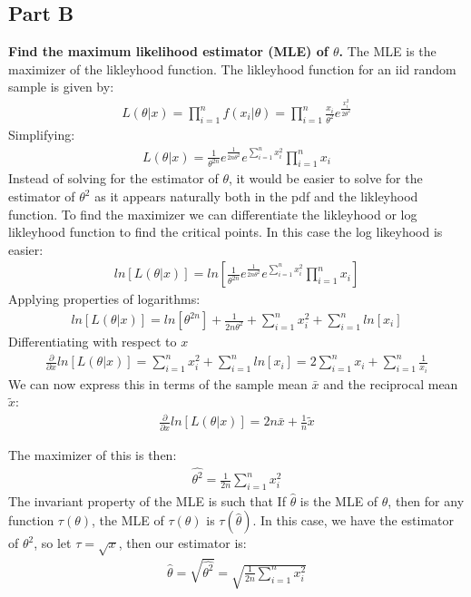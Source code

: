 \documentclass{article}
\begin{document}
\subsection*{Part B}
\textbf{Find the maximum likelihood estimator (MLE) of $\theta$.}
The MLE is the maximizer of the likleyhood function. The likleyhood function for an iid random sample is given by:
\begin{align*}
L(\theta|x) = \prod_{i=1}^{n} f(x_i|\theta) = \prod_{i=1}^{n} \frac{x_i}{\theta^2} e^{\frac{x_i^2}{2\theta^2}}
\end{align*}
Simplifying:
\begin{align*}
L(\theta|x) = \frac{1}{\theta^{2n}} e^{\frac{1}{2n\theta^2}} e^{\sum_{i=1}^{n} {x_i^2}} \prod_{i=1}^{n} x_i
\end{align*}
Instead of solving for the estimator of $\theta$, it would be easier to solve for the estimator of $\theta^2$ as it appears naturally both in the pdf and the likleyhood function. To find the maximizer we can differentiate the likleyhood or log likleyhood function to find the critical points. In this case the log likeyhood is easier:
\begin{align*}
ln[L(\theta|x)] = ln[ \frac{1}{\theta^{2n}} e^{\frac{1}{2n\theta^2}} e^{\sum_{i=1}^{n} {x_i^2}} \prod_{i=1}^{n} x_i ]
\end{align*}
Applying properties of logarithms:
\begin{align*}
ln[L(\theta|x)] = ln[\theta^{2n}] + \frac{1}{2n\theta^2} + \sum_{i=1}^{n} {x_i^2} + \sum_{i=1}^{n} ln[x_i]
\end{align*}
Differentiating with respect to $x$
\begin{align*}
\frac{\partial}{\partial x} ln[L(\theta|x)] = \sum_{i=1}^{n} {x_i^2} + \sum_{i=1}^{n} ln[x_i] = 2\sum_{i=1}^{n} {x_i} + \sum_{i=1}^{n} \frac{1}{x_i}
\end{align*}
We can now express this in terms of the sample mean $\bar{x}$ and the reciprocal mean $\tilde{x}$:
\begin{align*}
\frac{\partial}{\partial x} ln[L(\theta|x)] = 2n \bar{x} + \frac{1}{n} \tilde{x}
\end{align*}


The maximizer of this is then:
\begin{align*}
\hat{\theta^2} = \frac{1}{2n} \sum_{i=1}^{n} x_i^2
\end{align*}
The invariant property of the MLE is such that If $\hat{\theta}$ is the MLE of $\theta$, then for any function $\tau(\theta)$,
the MLE of $\tau(\theta)$ is $\tau(\hat{\theta})$. In this case, we have the estimator of $\theta^2$, so let $\tau=\sqrt{x}$, then our estimator is:
\begin{align*}
\boxed{ \hat{\theta} = \sqrt{\hat{\theta^2}} = \sqrt{ \frac{1}{2n} \sum_{i=1}^{n} x_i^2 } }
\end{align*}
\end{document}

